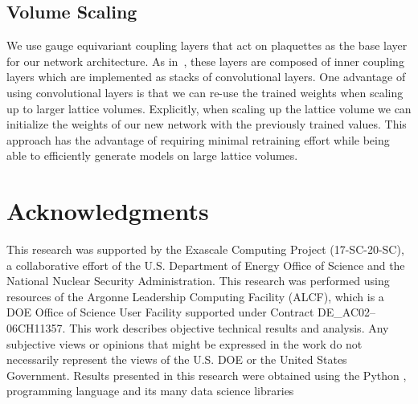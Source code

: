 \documentclass[a4paper,11pt]{article}
\begin{document}
\subsection{\label{subsec:volume_scaling}Volume Scaling}
%
We use gauge equivariant coupling layers that act on plaquettes as the
base layer for our network architecture.
%
As in~\cite{Albergo:2021vyo}, these layers are composed of inner coupling
layers which are implemented as stacks of convolutional layers.
%
One advantage of using convolutional layers is that we can re-use the trained
weights when scaling up to larger lattice volumes.
%
Explicitly, when scaling up the lattice volume we can initialize the weights
of our new network with the previously trained values.
%
This approach has the advantage of requiring minimal retraining effort while
being able to efficiently generate models on large lattice volumes.

\section{\label{sec:ack}Acknowledgments}
%
This research was supported by the Exascale Computing Project (17-SC-20-SC), a
collaborative effort of the U.S. Department of Energy Office of Science and the
National Nuclear Security Administration.
%
This research was performed using resources of the Argonne Leadership Computing
Facility (ALCF), which is a DOE Office of Science User Facility supported under
Contract DE\_AC02--06CH11357. 
%
This work describes objective technical results and analysis.
%
Any subjective views or opinions that might be expressed in the work do not
necessarily represent the views of the U.S. DOE or the United States
Government.
%
Results presented in this research were obtained using the Python
\citep{van1995python}, programming language and its many data science libraries
\cite{%
    matplotlib,
    numpyharris2020array,
    seaborn_michael_waskom_2017_883859,
    ipython4160251%
}




\end{document}
